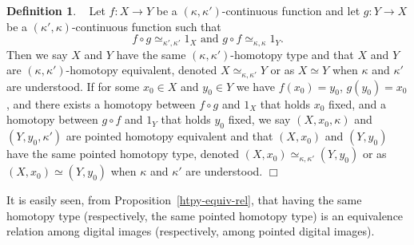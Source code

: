 \documentclass{article}
\theoremstyle{plain}
\theoremstyle{definition}
\newtheorem{definition}[thm]{Definition}
\numberwithin{thm}{section}
\def\Z{{\mathbb Z}}
\begin{document}


\begin{definition}
{\rm ~\cite{Boxer05}}
\label{htpy-type}
Let $f: X \rightarrow Y$ be a $(\kappa,\kappa')$-continuous function and let
$g: Y \rightarrow X$ be a $(\kappa',\kappa)$-continuous function such that
\[ f \circ g \simeq_{\kappa',\kappa'} 1_X \mbox{ and }
   g \circ f \simeq_{\kappa,\kappa} 1_Y. \]
Then we say $X$ and $Y$ have the {\rm same $(\kappa,\kappa')$-homotopy type}
and that $X$ and $Y$ are $(\kappa,\kappa')$-{\rm homotopy equivalent}, denoted 
$X \simeq_{\kappa,\kappa'} Y$ or as
$X \simeq Y$ when $\kappa$ and $\kappa'$ are
understood.
If for some $x_0 \in X$ and $y_0 \in Y$ we have
$f(x_0)=y_0$, $g(y_0)=x_0$,
and there exists a homotopy between $f \circ g$
and $1_X$ that holds $x_0$ fixed, and 
a homotopy between $g \circ f$
and $1_Y$ that holds $y_0$ fixed, we say
$(X,x_0,\kappa)$ and $(Y,y_0,\kappa')$ are
{\rm pointed homotopy equivalent} and that $(X,x_0)$ 
and $(Y,y_0)$ have the 
{\rm same pointed homotopy type}, denoted 
$(X,x_0) \simeq_{\kappa,\kappa'} (Y,y_0)$ or as
$(X,x_0) \simeq (Y,y_0)$ when 
$\kappa$ and $\kappa'$ are understood.
$\Box$
\end{definition}

It is easily seen, from 
Proposition~\ref{htpy-equiv-rel}, that having the
same homotopy type (respectively, the same
pointed homotopy type) is an equivalence relation
among digital images (respectively, among pointed
digital images).
\end{document}
